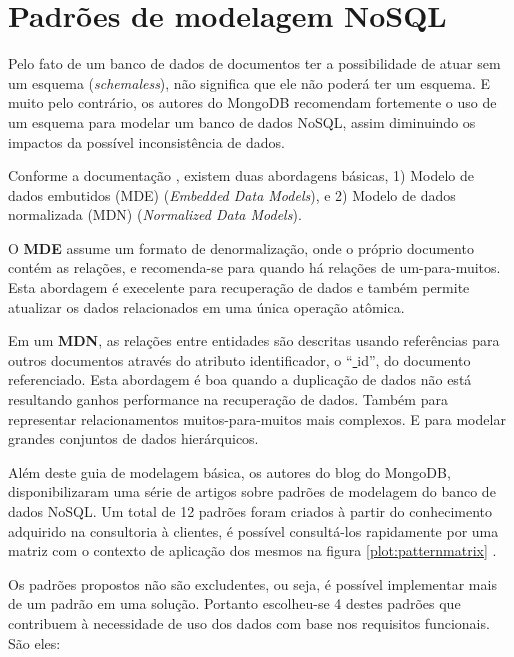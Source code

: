 \documentclass[
	12pt,				%
	openright,			%
	oneside,			%
	a4paper,			%
	english,			%
	french,				%
	spanish,			%
	brazil,				%
	]{abntex2}
\newcommand{\under}{\underline{ }}
\begin{document}
\section{Padrões de modelagem NoSQL}
Pelo fato de um banco de dados de documentos ter a possibilidade de atuar sem um esquema (\textit{schemaless}), não significa que ele não poderá ter um esquema. E muito pelo contrário, os autores do MongoDB recomendam fortemente o uso de um esquema para modelar um banco de dados NoSQL, assim diminuindo os impactos da possível inconsistência de dados. 

Conforme a documentação \cite{mongodocs}, existem duas abordagens básicas, 1) Modelo de dados embutidos (MDE) (\textit{Embedded Data Models}), e 2) Modelo de dados normalizada (MDN) (\textit{Normalized Data Models}).

O \textbf{MDE} assume um formato de denormalização, onde o próprio documento contém as relações, e recomenda-se para quando há relações de um-para-muitos. Esta abordagem é execelente para recuperação de dados e também permite atualizar os dados relacionados em uma única operação atômica.

Em um \textbf{MDN}, as relações entre entidades são descritas usando referências para outros documentos através do atributo identificador, o ``{\under}id'', do documento referenciado. Esta abordagem é boa quando a duplicação de dados não está resultando ganhos performance na recuperação de dados. Também para representar relacionamentos muitos-para-muitos mais complexos. E para modelar grandes conjuntos de dados hierárquicos.

Além deste guia de modelagem básica, os autores do blog do MongoDB, disponibilizaram uma série de artigos sobre padrões de modelagem do banco de dados NoSQL. Um total de 12 padrões foram criados à partir do conhecimento adquirido na consultoria à clientes, é possível consultá-los rapidamente por uma matriz com o contexto de aplicação dos mesmos na figura \ref{plot:patternmatrix} \cite{mongoblogpatterns}.

Os padrões propostos não são excludentes, ou seja, é possível implementar mais de um padrão em uma solução. Portanto escolheu-se 4 destes padrões que contribuem à necessidade de uso dos dados com base nos requisitos funcionais. São eles:
\end{document}
